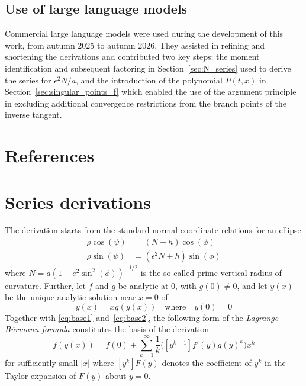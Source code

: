 \documentclass[a4paper]{amsart}
\begin{document}
\subsection*{Use of large language models}
Commercial large language models were used during the development of this work, from autumn 2025 to autumn 2026. They assisted in refining and shortening the derivations and contributed two key steps: the moment identification and subsequent factoring in Section~\ref{sec:N_series} used to derive the series for $\epsilon^2N/a$, and the introduction of the polynomial $P(t,x)$ in Section~\ref{sec:singular_points_f} which enabled the use of the argument principle in excluding additional convergence restrictions from the branch points of the inverse tangent.

\section*{References}
\printbibliography[heading=none]


\appendix
\newrefsegment %

\section{Series derivations}\label{app:A}
The derivation starts from the standard normal-coordinate relations for an ellipse
\begin{align}
\label{eq:base1}
\rho\cos(\psi) &= (N + h)\cos(\phi)\\
\label{eq:base2}
\rho\sin(\psi) &= (\epsilon^2 N + h)\sin(\phi)
\end{align}
where $N = a(1-e^2\sin^2(\phi))^{-1/2}$ is the so-called prime vertical radius of curvature.
%
Further, let $f$ and $g$ be analytic at 0, with $g(0)\neq0$, and let $y(x)$ be the unique analytic solution near $x=0$ of
\begin{equation*}
y(x)=xg(y(x))\quad\text{where}\quad y(0)=0
\end{equation*}
Together with \eqref{eq:base1} and~\eqref{eq:base2}, the following form of the \emph{Lagrange--B\"{u}rmann formula} constitutes the basis of the derivation
\begin{equation}\label{eq:lagrange-burmann}
f(y(x))=f(0) + \sum_{k=1}^\infty\frac{1}{k}\Big([y^{k-1}]f'(y)g(y)^k\Big) x^k
\end{equation}
for sufficiently small $|x|$ where $[y^k]F(y)$ denotes the coefficient of $y^k$ in the Taylor expansion of $F(y)$ about $y=0$.
\end{document}
